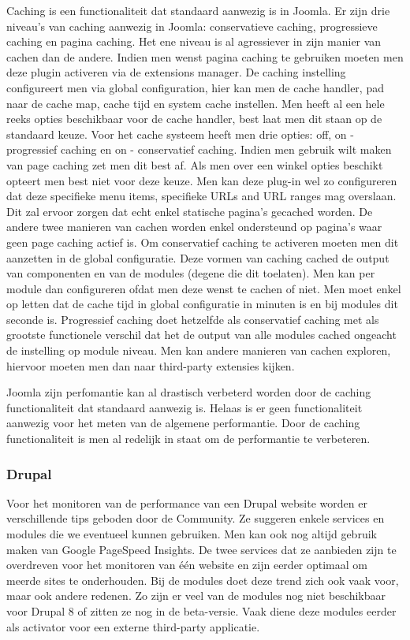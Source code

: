 Caching is een functionaliteit dat standaard aanwezig is in Joomla. Er zijn drie niveau's van caching aanwezig in Joomla: conservatieve caching, progressieve caching en pagina caching. Het ene niveau is al agressiever in zijn manier van cachen dan de andere. Indien men wenst pagina caching te gebruiken moeten men deze plugin activeren via de extensions manager. De caching instelling configureert men via global configuration, hier kan men de cache handler, pad naar de cache map, cache tijd en system cache instellen. Men heeft al een hele reeks opties beschikbaar voor de cache handler, best laat men dit staan op de standaard keuze. Voor het cache systeem heeft men drie opties: off, on - progressief caching en on - conservatief caching. Indien men gebruik wilt maken van page caching zet men dit best af. Als men over een winkel opties beschikt opteert men best niet voor deze keuze. Men kan deze plug-in wel zo configureren dat deze specifieke menu items, specifieke URLs and URL ranges mag overslaan. Dit zal ervoor zorgen dat echt enkel statische pagina's gecached worden. De andere twee manieren van cachen worden enkel ondersteund op pagina's waar geen page caching actief is. Om conservatief caching te activeren moeten men dit aanzetten in de global configuratie. Deze vormen van caching cached de output van componenten en van de modules (degene die dit toelaten). Men kan per module dan configureren ofdat men deze wenst te cachen of niet. Men moet enkel op letten dat de cache tijd in global configuratie in minuten is en bij modules dit seconde is. Progressief caching doet hetzelfde als conservatief caching met als grootste functionele verschil dat het de output van alle modules cached ongeacht de instelling op module niveau. Men kan andere manieren van cachen exploren, hiervoor moeten men dan naar third-party extensies kijken. 

Joomla zijn perfomantie kan al drastisch verbeterd worden door de caching functionaliteit dat standaard aanwezig is. Helaas is er geen functionaliteit aanwezig voor het meten van de algemene performantie. Door de caching functionaliteit is men al redelijk in staat om de performantie te verbeteren.
\subsubsection{Drupal}
Voor het monitoren van de performance van een Drupal website worden er verschillende tips geboden door de Community. Ze suggeren enkele services en modules die we eventueel kunnen gebruiken. Men kan ook nog altijd gebruik maken van Google PageSpeed Insights. De twee services dat ze aanbieden zijn te overdreven voor het monitoren van één website en zijn eerder optimaal om meerde sites te onderhouden. Bij de modules doet deze trend zich ook vaak voor, maar ook andere redenen. Zo zijn er veel van de modules nog niet beschikbaar voor Drupal 8 of zitten ze nog in de beta-versie. Vaak diene deze modules eerder als activator voor een externe third-party applicatie. 

